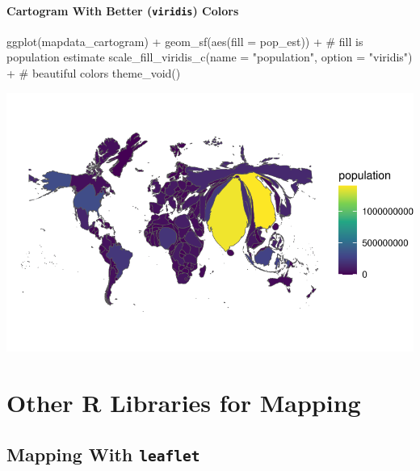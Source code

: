 \documentclass[
  letterpaper,
  DIV=11,
  numbers=noendperiod,
  oneside]{scrreprt}
\newenvironment{Shaded}{\begin{snugshade}}{\end{snugshade}}
\newcommand{\AttributeTok}[1]{\textcolor[rgb]{0.40,0.45,0.13}{#1}}
\newcommand{\CommentTok}[1]{\textcolor[rgb]{0.37,0.37,0.37}{#1}}
\newcommand{\FunctionTok}[1]{\textcolor[rgb]{0.28,0.35,0.67}{#1}}
\newcommand{\NormalTok}[1]{\textcolor[rgb]{0.00,0.23,0.31}{#1}}
\newcommand{\SpecialCharTok}[1]{\textcolor[rgb]{0.37,0.37,0.37}{#1}}
\newcommand{\StringTok}[1]{\textcolor[rgb]{0.13,0.47,0.30}{#1}}
\begin{document}
\subsection{\texorpdfstring{Cartogram With Better (\texttt{viridis})
Colors}{Cartogram With Better (viridis) Colors}}\label{cartogram-with-better-viridis-colors}

\begin{Shaded}
\begin{Highlighting}[]
\FunctionTok{ggplot}\NormalTok{(mapdata\_cartogram) }\SpecialCharTok{+} 
  \FunctionTok{geom\_sf}\NormalTok{(}\FunctionTok{aes}\NormalTok{(}\AttributeTok{fill =}\NormalTok{ pop\_est)) }\SpecialCharTok{+} \CommentTok{\# fill is population estimate}
  \FunctionTok{scale\_fill\_viridis\_c}\NormalTok{(}\AttributeTok{name =} \StringTok{"population"}\NormalTok{,}
                       \AttributeTok{option =} \StringTok{"viridis"}\NormalTok{) }\SpecialCharTok{+} \CommentTok{\# beautiful colors}
  \FunctionTok{theme\_void}\NormalTok{()}
\end{Highlighting}
\end{Shaded}

\includegraphics{cartogram_files/figure-pdf/unnamed-chunk-11-1.pdf}

\part{Other R Libraries for Mapping}

\chapter{\texorpdfstring{Mapping With
\texttt{leaflet}}{Mapping With leaflet}}\label{sec-leaflet}
\end{document}
